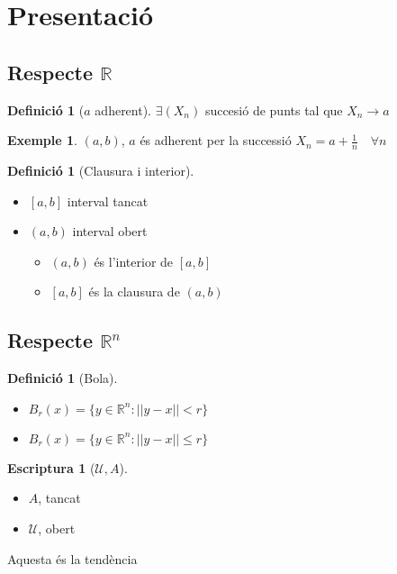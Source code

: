 \documentclass{article}
\theoremstyle{definition}
\newtheorem{definition}[theorem]{Definició}
\newtheorem{example}[theorem]{Exemple}
\newtheorem{writing}[theorem]{Escriptura}
\newcommand{\R}{\mathbb{R}}
\newcommand{\U}{\mathcal{U}}
\begin{document}
\tableofcontents

\section{Presentació}
\subsection{Respecte $\mathbb{R}$}
\begin{definition}[$a$ adherent]
$\exists (X_n)$ succesió de punts tal que $X_n \to a$
\end{definition}
\begin{example}
$(a, b)$, $a$ és adherent per la successió $X_n = a + \frac{1}{n} \quad \forall n$
\end{example}
\begin{definition}[Clausura i interior]
\begin{itemize}
\item $[a, b]$ interval tancat
\item $(a, b)$ interval obert
	\begin{itemize}
	\item[Definició:] $(a, b)$ és l'interior de $[a, b]$
	\item[Definició:] $[a, b]$ és la clausura de $(a, b)$
	\end{itemize}
\end{itemize}
\end{definition}

\subsection{Respecte $\R^n$}
\begin{definition}[Bola]
\begin{itemize}
\item[Bola oberta:] $B_r (x) = \{y \in \R^n : ||y -x|| < r\}$
\item[Bola tancada:] $B_r (x) = \{y \in \R^n : ||y -x|| \leq r\}$
\end{itemize}
\end{definition}

\begin{writing}[$\U, A$]
\begin{itemize}
\item $A$, tancat
\item $\U$, obert
\end{itemize}
Aquesta és la tendència
\end{writing}
\end{document}
